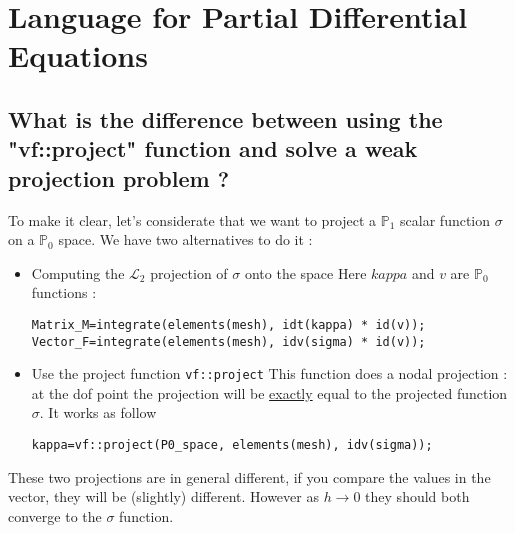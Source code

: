 \section{Language for Partial Differential Equations}
\label{faq:PDE}

\subsection{What is the difference between using the "vf::project" function and solve a weak projection problem ?}

To make it clear, let's considerate that we want to project a $\mathbb{P}_1$ scalar function $\sigma$ on a $\mathbb{P}_0$ space. We have two alternatives to do it :
\begin{itemize}
\item Computing the $\mathcal{L}_2$ projection of $\sigma$ onto the space \newline
Here $kappa$ and $v$ are $\mathbb{P}_0$ functions :
\begin{lstlisting}
Matrix_M=integrate(elements(mesh), idt(kappa) * id(v));
Vector_F=integrate(elements(mesh), idv(sigma) * id(v));
\end{lstlisting}

\item Use the project function \lstinline!vf::project! \newline
This function does a nodal projection : at the dof point the projection will be \underline{exactly} equal to the projected function $\sigma$. It works as follow 
\begin{lstlisting}
kappa=vf::project(P0_space, elements(mesh), idv(sigma));
\end{lstlisting}
\end{itemize}

These two projections are in general different, if you compare the values in the vector, they will be (slightly) different. However as $h \rightarrow 0$ they should both converge to the $\sigma$ function.


